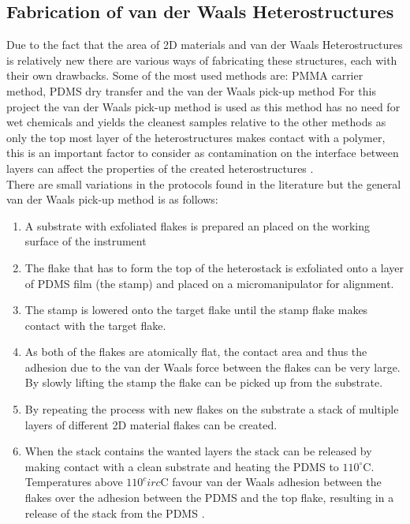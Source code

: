 \documentclass[10pt]{article}
\begin{document}
\subsection{Fabrication of van der Waals Heterostructures}
Due to the fact that the area of 2D materials and van der Waals Heterostructures is relatively new there are various ways of fabricating these structures, each with their own drawbacks.
Some of the most used methods are: PMMA carrier method, PDMS dry transfer and the van der Waals pick-up method
For this project the van der Waals pick-up method is used as this method has no need for wet chemicals and yields the cleanest samples relative to the other methods as only the top most layer of the heterostructures makes contact with a polymer, this is an important factor to consider as contamination on the interface between layers can affect the properties of the created heterostructures \cite{pizzoccheroHotPickupTechnique2016,frisendaRecentProgressAssembly2018}.\\

There are small variations in the protocols found in the literature but the general van der Waals pick-up method is as follows:
\begin{enumerate}[noitemsep]
\item A substrate with exfoliated flakes is prepared an placed on the working surface of the instrument
\item The flake that has to form the top of the heterostack is exfoliated onto a layer of PDMS film (the stamp) and placed on a micromanipulator for alignment.
\item The stamp is lowered onto the target flake until the stamp flake makes contact with the target flake.
\item As both of the flakes are atomically flat, the contact area and thus the adhesion due to the van der Waals force between the flakes can be very large.
By slowly lifting the stamp the flake can be picked up from the substrate.
\item By repeating the process with new flakes on the substrate a stack of multiple layers of different 2D material flakes can be created.
\item When the stack contains the wanted layers the stack can be released by making contact with a clean substrate and heating the PDMS to $110^\circ$C.
Temperatures above $110^circ$C favour van der Waals adhesion between the flakes over the adhesion between the PDMS and the top flake, resulting in a release of the stack from the PDMS \cite{pizzoccheroHotPickupTechnique2016}.
\end{enumerate}
\end{document}
